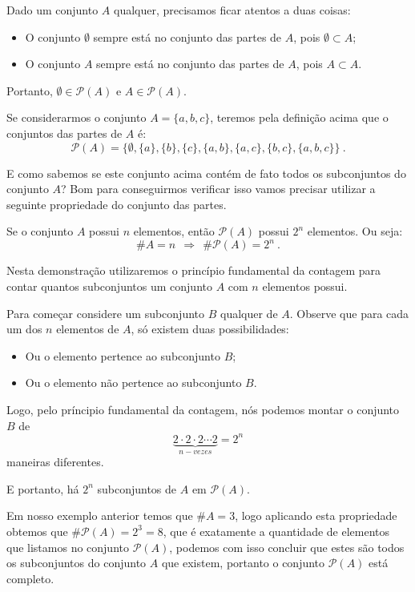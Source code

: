  Dado um conjunto $A$ qualquer, precisamos ficar atentos a duas coisas:
 \begin{itemize}
 \item O conjunto $\emptyset$ sempre está no conjunto das partes de $A$, pois $\emptyset \subset A$;
 \item O conjunto $A$ sempre está no conjunto das partes de $A$, pois $A \subset A$.
 \end{itemize}
 Portanto, $\emptyset \in \mathcal{P}(A)$ e $A \in \mathcal{P}(A)$.

 \begin{exem}
 Se considerarmos o conjunto $A= \{a, b, c\}$, teremos pela definição acima que o conjuntos das partes de $A$ é:
 \[\mathcal{P}(A)= \{ \emptyset, \{a\}, \{b\}, \{c\}, \{a, b\}, \{a, c\}, \{b, c\}, \{a, b, c\} \} \ .\]
 \end{exem}

 E como sabemos se este conjunto acima contém de fato todos os subconjuntos do conjunto $A$? Bom para conseguirmos verificar isso vamos precisar utilizar a seguinte propriedade do conjunto das partes.

 \begin{prop}
  Se o conjunto $A$ possui $n$ elementos, então $\mathcal{P}(A)$ possui $2^n$ elementos. Ou seja:
  \[\# A= n \ \ \Rightarrow \ \ \# \mathcal{P}(A)= 2^n \ .\]
\end{prop}

 \begin{dem}
 Nesta demonstração utilizaremos o princípio fundamental da contagem para contar quantos subconjuntos um conjunto $A$ com $n$ elementos possui.

 Para começar considere um subconjunto $B$ qualquer de $A$. Observe que para cada um dos $n$ elementos de $A$, só existem duas possibilidades:
 \begin{itemize}
 \item Ou o elemento pertence ao subconjunto $B$;
 \item Ou o elemento não pertence ao subconjunto $B$.
 \end{itemize}

 Logo, pelo príncipio fundamental da contagem, nós podemos montar o conjunto $B$ de
 \[\underbrace{2 \cdot 2 \cdot 2 \cdots 2}_{n-vezes}= 2^n\]
 maneiras diferentes.

 E portanto, há $2^n$ subconjuntos de $A$ em $\mathcal{P}(A)$.
 \end{dem}

 Em nosso exemplo anterior temos que $\# A= 3$, logo aplicando esta propriedade obtemos que $\# \mathcal{P}(A)= 2^3= 8$, que é exatamente a quantidade de elementos que listamos no conjunto $\mathcal{P}(A)$, podemos com isso concluir que estes são todos os subconjuntos do conjunto $A$ que existem, portanto o conjunto $\mathcal{P}(A)$ está completo.



